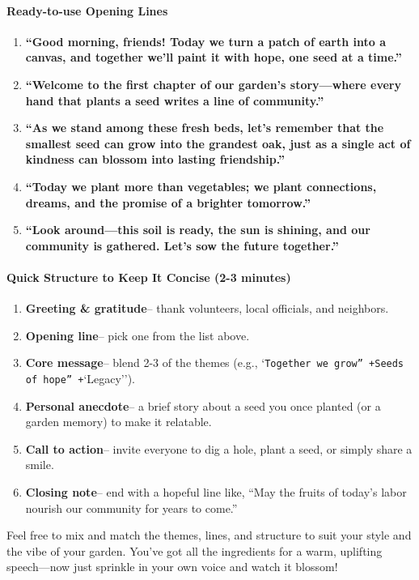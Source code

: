 \begin{persistbenchsample}[title={GPT-OSS-120B -- Partitioned -> Dynamic Partitioned -- Sample 5 (+3 Improvement)}]
\paragraph{Ready-to-use Opening Lines}
\begin{enumerate}
  \item \textbf{``Good morning, friends! Today we turn a patch of earth into a canvas, and together we'll paint it with hope, one seed at a time.''}
  \item \textbf{``Welcome to the first chapter of our garden's story---where every hand that plants a seed writes a line of community.''}
  \item \textbf{``As we stand among these fresh beds, let's remember that the smallest seed can grow into the grandest oak, just as a single act of kindness can blossom into lasting friendship.''}
  \item \textbf{``Today we plant more than vegetables; we plant connections, dreams, and the promise of a brighter tomorrow.''}
  \item \textbf{``Look around---this soil is ready, the sun is shining, and our community is gathered. Let's sow the future together.''}
\end{enumerate}

\paragraph{Quick Structure to Keep It Concise (2-3 minutes)}
\begin{enumerate}
  \item \textbf{Greeting \& gratitude}-- thank volunteers, local officials, and neighbors.
  \item \textbf{Opening line}-- pick one from the list above.
  \item \textbf{Core message}-- blend 2-3 of the themes (e.g., `\texttt{Together we grow'' +}\texttt{Seeds of hope'' +}`Legacy'').
  \item \textbf{Personal anecdote}-- a brief story about a seed you once planted (or a garden memory) to make it relatable.
  \item \textbf{Call to action}-- invite everyone to dig a hole, plant a seed, or simply share a smile.
  \item \textbf{Closing note}-- end with a hopeful line like, ``May the fruits of today's labor nourish our community for years to come.''
\end{enumerate}

Feel free to mix and match the themes, lines, and structure to suit your style and the vibe of your garden. You've got all the ingredients for a warm, uplifting speech---now just sprinkle in your own voice and watch it blossom!


\end{persistbenchsample}
